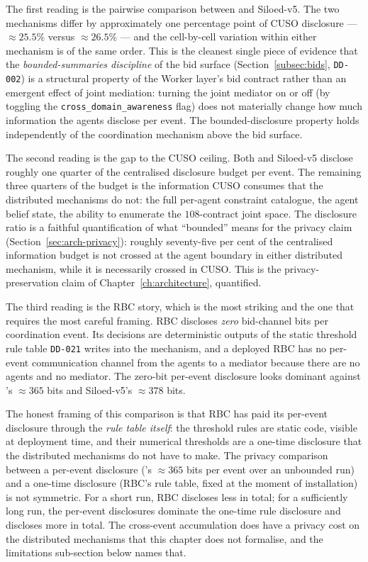 The first reading is the pairwise comparison between \NEXUS{} and
Siloed-v5. The two mechanisms differ by approximately one percentage
point of CUSO disclosure --- $\approx 25.5\%$ versus $\approx 26.5\%$
--- and the cell-by-cell variation within either mechanism is of the
same order. This is the cleanest single piece of evidence that the
\emph{bounded-summaries discipline} of the bid surface
(Section~\ref{subsec:bids}, \texttt{DD-002}) is a structural
property of the Worker layer's bid contract rather than an emergent
effect of joint mediation: turning the joint mediator on or off
(by toggling the \texttt{cross\_domain\_awareness} flag) does not
materially change how much information the agents disclose per
event. The bounded-disclosure property holds independently of the
coordination mechanism above the bid surface.

The second reading is the gap to the CUSO ceiling. Both \NEXUS{} and
Siloed-v5 disclose roughly one quarter of the centralised disclosure
budget per event. The remaining three quarters of the budget is the
information CUSO consumes that the distributed mechanisms do not:
the full per-agent constraint catalogue, the agent belief state, the
ability to enumerate the $108$-contract joint space. The disclosure
ratio is a faithful quantification of what
``bounded'' means for the privacy claim
(Section~\ref{sec:arch-privacy}): roughly seventy-five per cent of
the centralised information budget is not crossed at the agent
boundary in either distributed mechanism, while it is necessarily
crossed in CUSO. This is the privacy-preservation claim of
Chapter~\ref{ch:architecture}, quantified.

The third reading is the RBC story, which is the most striking and
the one that requires the most careful framing. RBC discloses
\emph{zero} bid-channel bits per coordination event. Its decisions
are deterministic outputs of the static threshold rule table
\texttt{DD-021} writes into the mechanism, and a deployed RBC has
no per-event communication channel from the agents to a mediator
because there are no agents and no mediator. The zero-bit per-event
disclosure looks dominant against \NEXUS{}'s $\approx 365$ bits and
Siloed-v5's $\approx 378$ bits.

The honest framing of this comparison is that RBC has paid its
per-event disclosure through the \emph{rule table itself}: the
threshold rules are static code, visible at deployment time, and
their numerical thresholds are a one-time disclosure that the
distributed mechanisms do not have to make. The privacy comparison
between a per-event disclosure (\NEXUS{}'s $\approx 365$ bits per
event over an unbounded run) and a one-time disclosure (RBC's rule
table, fixed at the moment of installation) is not symmetric. For a
short run, RBC discloses less in total; for a sufficiently long run,
the per-event disclosures dominate the one-time rule disclosure and
\NEXUS{} discloses more in total. The cross-event accumulation does
have a privacy cost on the distributed mechanisms that this chapter
does not formalise, and the limitations sub-section below names
that.

